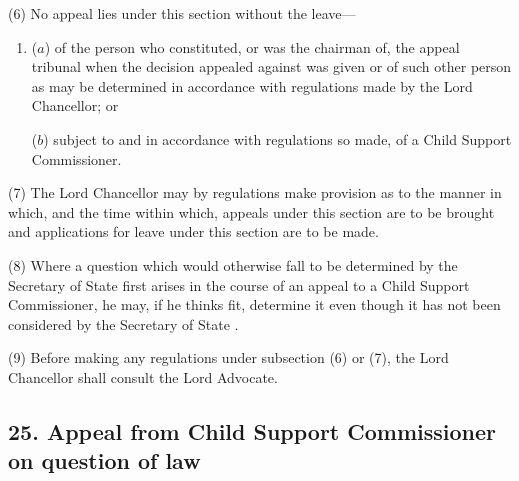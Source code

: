 \documentclass[12pt,a4paper]{article}
\begin{document}
(6) No appeal lies under this section without the leave—
\begin{enumerate}\item[]
($a$) of the person 
who constituted, or was the chairman of, the appeal tribunal  %
when the decision appealed against was given or of 
such other person  %
as may be determined in accordance with regulations made by the Lord Chancellor; or

($b$) subject to and in accordance with regulations so made, of a Child Support Commissioner.
\end{enumerate}

(7) The Lord Chancellor may by regulations make provision as to the manner in which, and the time within which, appeals under this section are to be brought and applications for leave under this section are to be made.

(8) Where a question which would otherwise fall to be determined by 
the Secretary of State  %
first arises in the course of an appeal to a Child Support Commissioner, he may, if he thinks fit, determine it even though it has not been considered by 
the Secretary of State%
.

(9) Before making any regulations under subsection (6)  or (7), the Lord Chancellor shall consult the Lord Advocate.


\subsection{25. Appeal from Child Support Commissioner on question of law}
\end{document}
